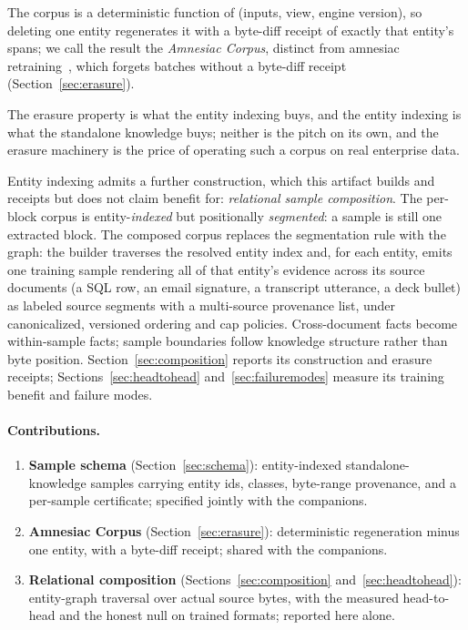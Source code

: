 \documentclass{article}
\begin{document}
The corpus is a deterministic function of (inputs, view, engine version), so deleting one entity regenerates it with a byte-diff receipt of exactly that entity's spans; we call the result the \emph{Amnesiac Corpus}, distinct from amnesiac retraining~\cite{graves2021amnesiac}, which forgets batches without a byte-diff receipt (Section~\ref{sec:erasure}).

The erasure property is what the entity indexing buys, and the entity indexing is what the standalone knowledge buys; neither is the pitch on its own, and the erasure machinery is the price of operating such a corpus on real enterprise data.

Entity indexing admits a further construction, which this artifact builds and receipts but does not claim benefit for: \emph{relational sample composition}. The per-block corpus is entity-\emph{indexed} but positionally \emph{segmented}: a sample is still one extracted block. The composed corpus replaces the segmentation rule with the graph: the builder traverses the resolved entity index and, for each entity, emits one training sample rendering all of that entity's evidence across its source documents (a SQL row, an email signature, a transcript utterance, a deck bullet) as labeled source segments with a multi-source provenance list, under canonicalized, versioned ordering and cap policies. Cross-document facts become within-sample facts; sample boundaries follow knowledge structure rather than byte position. Section~\ref{sec:composition} reports its construction and erasure receipts; Sections~\ref{sec:headtohead} and~\ref{sec:failuremodes} measure its training benefit and failure modes.

\paragraph{Contributions.}
\begin{enumerate}
  \item \textbf{Sample schema} (Section~\ref{sec:schema}): entity-indexed standalone-knowledge samples carrying entity ids, classes, byte-range provenance, and a per-sample certificate; specified jointly with the companions.
  \item \textbf{Amnesiac Corpus} (Section~\ref{sec:erasure}): deterministic regeneration minus one entity, with a byte-diff receipt; shared with the companions.
  \item \textbf{Relational composition} (Sections~\ref{sec:composition} and~\ref{sec:headtohead}): entity-graph traversal over actual source bytes, with the measured head-to-head and the honest null on trained formats; reported here alone.
\end{enumerate}
\end{document}
